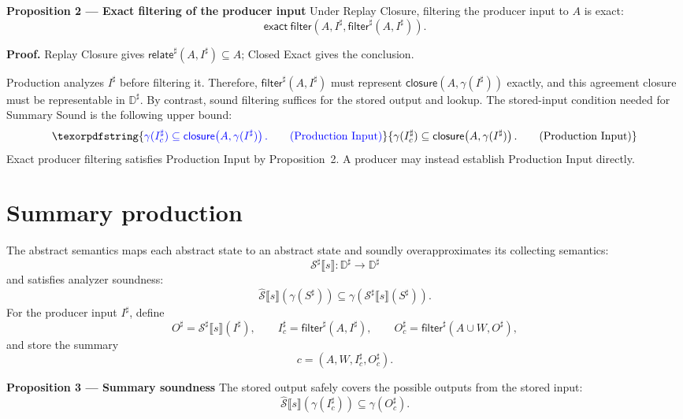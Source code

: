 \documentclass[10pt]{article}
\newcommand{\REV}[1]{{\color{reviewpink}#1}}
\newcommand{\boxheading}[1]{\textbf{#1}\quad}
\newcommand{\CollectingSemantics}[1]{\widehat{\mathcal S}\mathopen{⟦}#1\mathclose{⟧}}
\newcommand{\AbstractSemantics}[1]{\mathcal S^\sharp\mathopen{⟦}#1\mathclose{⟧}}
\newcommand{\ProjClose}{\mathsf{closure}}
\newcommand{\filter}{\mathsf{filter}}
\newcommand{\relate}{\mathsf{relate}}
\newcommand{\ExactFilter}{\mathsf{exact\ filter}}
\newcommand{\qedbox}{\hfill\raisebox{0.15ex}{\fboxsep=0pt\fbox{\rule{0pt}{0.55em}\rule{0.55em}{0pt}}}}
\providecommand{\DIFaddtex}[1]{{\protect\color{blue} #1}} %
\providecommand{\DIFdeltex}[1]{{\protect\color{red} \scriptsize #1}} %
\providecommand{\DIFaddbegin}{} %
\providecommand{\DIFaddend}{} %
\providecommand{\DIFdelbegin}{} %
\providecommand{\DIFdelend}{} %
\providecommand{\DIFadd}[1]{\texorpdfstring{\DIFaddtex{#1}}{#1}} %
\providecommand{\DIFdel}[1]{\texorpdfstring{\DIFdeltex{#1}}{}} %
\begin{document}
\begin{statementbox}
\boxheading{Proposition 2 --- Exact filtering of the producer input}
Under Replay Closure, filtering the producer input to \(A\) is exact:
\[
  \ExactFilter\!\left(A,I^\sharp,\filter^\sharp(A,I^\sharp)\right).
\]
\end{statementbox}

\textbf{Proof.}
Replay Closure gives \(\relate^\sharp(A,I^\sharp)\subseteq A\); Closed Exact gives the
conclusion. \qedbox

\DIFdelbegin \DIFdel{Production analyzes \(I^\sharp\) before filtering it. Therefore,
\(\filter^\sharp(A,I^\sharp)\) must represent \(\ProjClose(A,\gamma(I^\sharp))\) exactly,
and this agreement closure must be representable in \(\mathbb D^\sharp\). By contrast, sound
filtering suffices for the stored output and lookup.
}\DIFdelend \DIFaddbegin \DIFadd{\REV{The stored-input condition needed for Summary Sound is the following upper bound:}
}\[
  \DIFadd{\gamma(I_c^\sharp)
  \subseteq
  \ProjClose\!\left(A,\gamma(I^\sharp)\right).
  \tag{Production Input}
}\]
\DIFadd{\REV{Exact producer filtering satisfies Production Input by Proposition~2. A producer may instead
establish Production Input directly.}
}\DIFaddend

\section{Summary production}

The abstract semantics maps each abstract state to an abstract state and soundly overapproximates
its collecting semantics:
\[
  \AbstractSemantics{s}:\mathbb D^\sharp\to\mathbb D^\sharp
\]
and satisfies analyzer soundness:
\[
  \CollectingSemantics{s}\!\left(\gamma(S^\sharp)\right)
  \subseteq\gamma\!\left(\AbstractSemantics{s}(S^\sharp)\right).
  \tag{Analyze Sound}
\]
For the producer input \(I^\sharp\), define
\[
  O^\sharp=\AbstractSemantics{s}(I^\sharp),
  \qquad
  I_c^\sharp=\filter^\sharp(A,I^\sharp),
  \qquad
  O_c^\sharp=\filter^\sharp(A\cup W,O^\sharp),
\]
and store the summary
\[
  c=(A,W,I_c^\sharp,O_c^\sharp).
\]

\begin{statementbox}
\boxheading{Proposition 3 --- Summary soundness}
The stored output safely covers the possible outputs from the stored input:
\[
  \CollectingSemantics{s}\!\left(\gamma(I_c^\sharp)\right)
  \subseteq\gamma(O_c^\sharp).
  \tag{Summary Sound}
\]
\end{statementbox}
\end{document}
